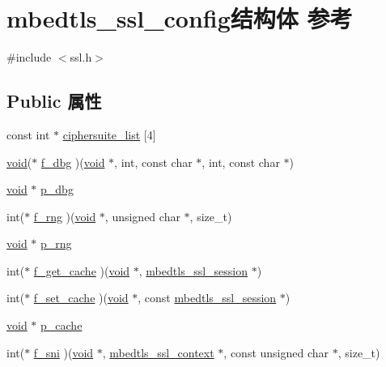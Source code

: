 \hypertarget{structmbedtls__ssl__config}{}\section{mbedtls\+\_\+ssl\+\_\+config结构体 参考}
\label{structmbedtls__ssl__config}


{\ttfamily \#include $<$ssl.\+h$>$}

\subsection*{Public 属性}
\begin{DoxyCompactItemize}
\item 
const int $\ast$ \hyperlink{structmbedtls__ssl__config_a15e716727b7dd508dfb96e270f37919f}{ciphersuite\+\_\+list} \mbox{[}4\mbox{]}
\item 
\hyperlink{interfacevoid}{void}($\ast$ \hyperlink{structmbedtls__ssl__config_a9e57da8e5afa816d105a1ae95eb2e23d}{f\+\_\+dbg} )(\hyperlink{interfacevoid}{void} $\ast$, int, const char $\ast$, int, const char $\ast$)
\item 
\hyperlink{interfacevoid}{void} $\ast$ \hyperlink{structmbedtls__ssl__config_ad591b46fdb117d844c0a5f7366423c48}{p\+\_\+dbg}
\item 
int($\ast$ \hyperlink{structmbedtls__ssl__config_a9250c08f11a4e549b6f9d48ba9a977d1}{f\+\_\+rng} )(\hyperlink{interfacevoid}{void} $\ast$, unsigned char $\ast$, size\+\_\+t)
\item 
\hyperlink{interfacevoid}{void} $\ast$ \hyperlink{structmbedtls__ssl__config_a1eff6c9817251b686e8f518597590476}{p\+\_\+rng}
\item 
int($\ast$ \hyperlink{structmbedtls__ssl__config_a92d52d27abd228e5e5293ea41b065d9a}{f\+\_\+get\+\_\+cache} )(\hyperlink{interfacevoid}{void} $\ast$, \hyperlink{structmbedtls__ssl__session}{mbedtls\+\_\+ssl\+\_\+session} $\ast$)
\item 
int($\ast$ \hyperlink{structmbedtls__ssl__config_a2664effc0267e63b27cc95eea8213865}{f\+\_\+set\+\_\+cache} )(\hyperlink{interfacevoid}{void} $\ast$, const \hyperlink{structmbedtls__ssl__session}{mbedtls\+\_\+ssl\+\_\+session} $\ast$)
\item 
\hyperlink{interfacevoid}{void} $\ast$ \hyperlink{structmbedtls__ssl__config_ac5f5d3d7a788e65c722db381c66ecb24}{p\+\_\+cache}
\item 
int($\ast$ \hyperlink{structmbedtls__ssl__config_a00e330604cc40f0097b5f8ad3fb7b297}{f\+\_\+sni} )(\hyperlink{interfacevoid}{void} $\ast$, \hyperlink{structmbedtls__ssl__context}{mbedtls\+\_\+ssl\+\_\+context} $\ast$, const unsigned char $\ast$, size\+\_\+t)

\end{DoxyCompactItemize}
